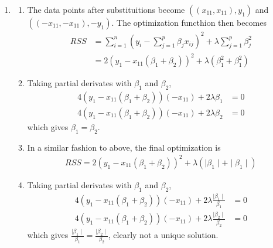 \documentclass[11pt, a4paper]{article}
\begin{document}
\begin{enumerate}
        \item
        \begin{enumerate}
            \item The data points after substituitions become $((x_{11}, x_{11}), y_{1})$ and $((-x_{11}, -x_{11}), -y_{1})$. The optimization functhion then becomes
            \begin{align*}
                RSS &= \sum_{i=1}^{n}(y_{i} - \sum_{j=1}^{p} \beta_{j}x_{ij})^{2} + \lambda \sum_{j=1}^{p}\beta_{j}^{2}\\
                  &= 2(y_{1}-x_{11}(\beta_{1}+\beta_{2}))^{2} + \lambda(\beta_{1}^{2} + \beta_{1}^{2})
            \end{align*}
            \item Taking partial derivates with $\beta_{1}$ and $\beta_{2}$,
            \begin{align*}
                4(y_{1} - x_{11}(\beta_{1} + \beta_{2}))(-x_{11}) + 2\lambda \beta_{1} &= 0\\
                4(y_{1} - x_{11}(\beta_{1} + \beta_{2}))(-x_{11}) + 2\lambda \beta_{2} &= 0
            \end{align*}
            which gives $\beta_{1} = \beta_{2}$.
            \item In a similar fashion to above, the final optimization is
            \begin{align*}
                 RSS = 2(y_{1}-x_{11}(\beta_{1}+\beta_{2}))^{2} + \lambda(\mid \beta_{1} \mid + \mid \beta_{1} \mid)
            \end{align*}
            \item Taking partial derivates with $\beta_{1}$ and $\beta_{2}$,
            \begin{align*}
                4(y_{1} - x_{11}(\beta_{1} + \beta_{2}))(-x_{11}) + 2\lambda \frac{\mid \beta_{1} \mid}{\beta_{1}} &= 0\\
                4(y_{1} - x_{11}(\beta_{1} + \beta_{2}))(-x_{11}) + 2\lambda \frac{\mid \beta_{2} \mid}{\beta_{2}} &= 0
            \end{align*}
            which gives $\frac{\mid \beta_{1} \mid}{\beta_{1}} = \frac{\mid \beta_{2} \mid}{\beta_{2}}$, clearly not a unique solution.
        \end{enumerate}
        

\end{enumerate}
\end{document}
